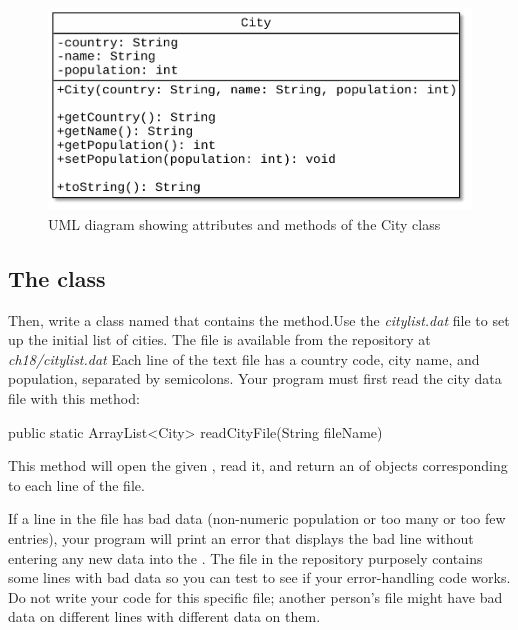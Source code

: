 \begin{exercise}
\begin{figure}[!h]
\begin{center}
\includegraphics[scale=0.75]{figs/ch18/city.pdf}
\caption{UML diagram showing attributes and methods of the City class}
\label{fig.ch18.cityUML}
\end{center}
\end{figure}


\subsection{The  class}

Then, write a class named  that contains the  method.Use the {\em citylist.dat} file to set up the initial list of cities. The file is available from the repository at {\em ch18/citylist.dat} Each line of the text file has a country code, city name, and population, separated by semicolons. Your program must first read the city data file with this method:

\begin{stdout}
public static ArrayList<City> readCityFile(String fileName)
\end{stdout}

This method will open the given , read it, and return an  of  objects corresponding to each line of the file.

If a line in the file has bad data (non-numeric population or too many or too few entries), your program will print an error that displays the bad line without entering any new data into the . The  file in the repository purposely contains some lines with bad data so you can test to see if your error-handling code works. Do not write your code for this specific file; another person's file might have bad data on different lines with different data on them.


\end{exercise}
